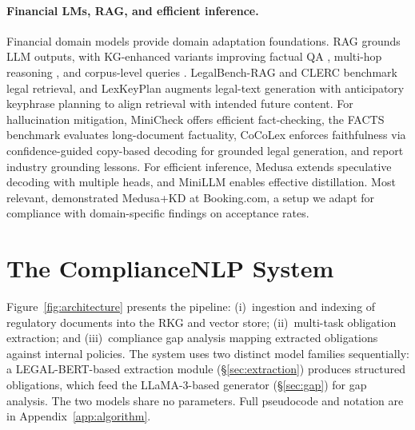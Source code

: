 \documentclass[11pt]{article}
\begin{document}
\paragraph{Financial LMs, RAG, and efficient inference.}
Financial domain models \citep{araci2019finbert,wu2023bloomberggpt,yang2023fingpt,xie2023pixiu,lee2025finllmsurvey} provide domain adaptation foundations. RAG \citep{lewis2020rag} grounds LLM outputs, with KG-enhanced variants improving factual QA \citep{baek2023kaping}, multi-hop reasoning \citep{sen2023kgrag}, and corpus-level queries \citep{edge2024graphrag}. LegalBench-RAG \citep{pipitone2024legalbenchrag} and CLERC \citep{hou2025clerc} benchmark legal retrieval, and LexKeyPlan \citep{santosh2025lexkeyplan} augments legal-text generation with anticipatory keyphrase planning to align retrieval with intended future content. For hallucination mitigation, MiniCheck \citep{tang2024minicheck} offers efficient fact-checking, the FACTS benchmark \citep{kag2025facts} evaluates long-document factuality, CoCoLex \citep{santosh2025cocolex} enforces faithfulness via confidence-guided copy-based decoding for grounded legal generation, and \citet{kenthapadi2024grounding} report industry grounding lessons. For efficient inference, Medusa \citep{cai2024medusa} extends speculative decoding \citep{leviathan2023speculative,chen2023speculativesampling} with multiple heads, and MiniLLM \citep{gu2024minillm} enables effective distillation. Most relevant, \citet{zagyva2025speedwithoutsacrifice} demonstrated Medusa+KD at Booking.com, a setup we adapt for compliance with domain-specific findings on acceptance rates.


\section{The ComplianceNLP System}
\label{sec:system}

Figure~\ref{fig:architecture} presents the pipeline: (i)~ingestion and indexing of regulatory documents into the RKG and vector store; (ii)~multi-task obligation extraction; and (iii)~compliance gap analysis mapping extracted obligations against internal policies. The system uses two distinct model families sequentially: a LEGAL-BERT-based extraction module (\S\ref{sec:extraction}) produces structured obligations, which feed the LLaMA-3-based generator (\S\ref{sec:gap}) for gap analysis. The two models share no parameters. Full pseudocode and notation are in Appendix~\ref{app:algorithm}.
\end{document}
